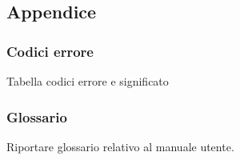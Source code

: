 \subsection{Appendice}
\subsubsection{Codici errore}
Tabella codici errore e significato

\subsubsection{Glossario}
Riportare glossario relativo al manuale utente.
